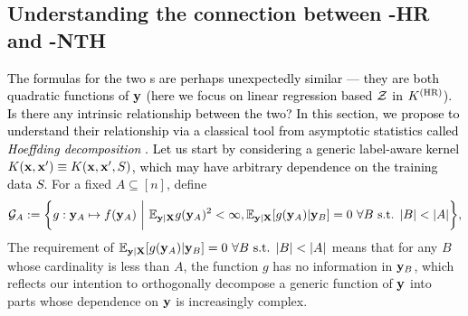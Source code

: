 
\subsection{Understanding the connection between \lantk-HR and \lantk-NTH}
\label{sec:conn-with-hoeffd}
\textcolor{black}{The formulas for the two \lantk s are perhaps unexpectedly similar --- they are both quadratic functions of ${\mathbf{y}}$ (here we focus on linear regression based ${\mathcal{Z}}$ in $K^{(\textnormal{HR})}$). 
Is there any intrinsic relationship between the two? In this section, we propose to understand their relationship via a classical tool from asymptotic statistics called \emph{Hoeffding decomposition} \citep{hoeffding1948class}. Let us start by considering a generic label-aware kernel $K({\mathbf{x}}, {\mathbf{x}}') \equiv K({\mathbf{x}}, {\mathbf{x}}', S)$, which may have arbitrary dependence on the training data $S$.}
For a fixed $A \subseteq [n]$, define
\begin{equation}
    \label{eq: func_space_hoeffding_decomp}
    \gG_A := \bigg\{g: \rvy_A\mapsto f(\rvy_A) \ \bigg| \ \E_{\rvy|\rmX} g(\rvy_A)^2 < \infty, \E_{\rvy|\rmX}[g(\rvy_A) | \rvy_B] = 0 \ \forall B \textnormal{ s.t. } |B| < |A|\bigg\},
\end{equation}
The requirement of $\mathbb{E}_{{\mathbf{y}}|{\mathbf{X}}}[g({\mathbf{y}}_A) | {\mathbf{y}}_B] = 0 \ \forall B \textnormal{ s.t. } |B| < |A|$ means that for any $B$ whose cardinality is less than $A$, the function $g$ has no information in ${\mathbf{y}}_B$, which reflects our intention to orthogonally decompose a generic function of ${\mathbf{y}}$ into parts whose dependence on ${\mathbf{y}}$ is increasingly complex. 


